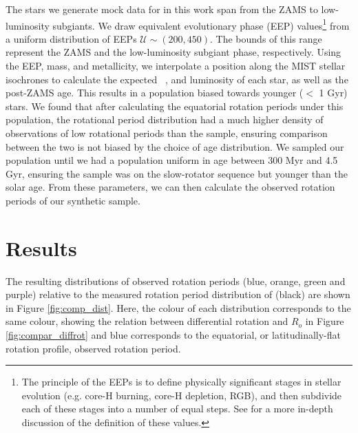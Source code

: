 The stars we generate mock data for in this work span from the ZAMS to low-luminosity subgiants.
We draw equivalent evolutionary phase (EEP) values\footnote{The principle of the EEPs is to define physically significant stages in stellar evolution (e.g. core-H burning, core-H depletion, RGB), and then subdivide each of these stages into a number of equal steps. See \citet{morton_isochrones_2015} for a more in-depth discussion of the definition of these values.} from a uniform distribution of EEPs $\mathcal{U}\sim(200,450)$.
The bounds of this range represent the ZAMS and the low-luminosity subgiant phase, respectively.
Using the EEP, mass, and metallicity, we interpolate a position along the MIST stellar isochrones \citep{morton_isochrones_2015} to calculate the expected \teff \ , and luminosity of each star, as well as the post-ZAMS age.
This results in a population biased towards younger ($<$ 1 Gyr) stars.
We found that after calculating the equatorial rotation periods under this population, the rotational period distribution had a much higher density of observations of low rotational periods than the \citet{mcquillan_rotation_2014} sample, ensuring comparison between the two is not biased by the choice of age distribution.
We sampled our population until we had a population uniform in age between 300 Myr and 4.5 Gyr, ensuring the sample was on the slow-rotator sequence but younger than the solar age.
From these parameters, we can then calculate the observed rotation periods of our synthetic sample.

\section{Results}
\label{sec:results}

The resulting distributions of observed rotation periods (blue, orange, green and purple) relative to the measured rotation period distribution of \kepler{} \citep{mcquillan_rotation_2014} (black) are shown in Figure \ref{fig:comp_dist}.
Here, the colour of each distribution corresponds to the same colour, showing the relation between differential rotation and $R_o$ in Figure \ref{fig:compar_diffrot} and blue corresponds to the equatorial, or latitudinally-flat rotation profile, observed rotation period.

